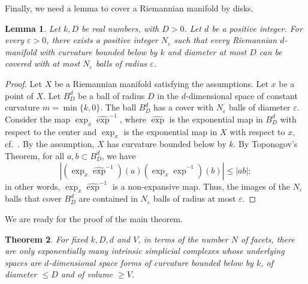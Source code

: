 \documentclass[a4paper,11pt]{article}
\theoremstyle{plain}
\newtheorem{theorem}{\bf Theorem}[section]
\newtheorem{lemma}[theorem]{Lemma}
\theoremstyle{definition}
\newcommand{\e}{\varepsilon}
\begin{document}
Finally, we need a lemma to cover a Riemannian manifold by disks.

\begin{lemma}\label{lem:finitecover}
Let $k, D$ be real numbers, with $D>0$. Let $d$ be a positive integer. For every $\e>0$, there exists a positive integer $N_\e$ such that every Riemannian $d$-manifold with curvature bounded below by $k$ and diameter at most $D$ can be covered with at most $N_\e$ balls of radius $\e$.
\end{lemma}

\begin{proof}
Let $X$ be a Riemannian manifold satisfying the assumptions. Let $x$ be a point of $X$. 
Let $B^d_D$ be a ball of radius $D$ in the $d$-dimensional space 
of constant curvature $m = \min \{ k,0 \}$. The ball $B^d_D$ has a cover with 
$N_\e$ balls of diameter $\e$.
Consider the map $ \exp_x \widehat{\exp}^{-1}$, where $\widehat{\exp}$ is 
the exponential map in $B^d_D$ with respect to the center and $\exp_x$ 
is the exponential map in $X$ with respect to $x$, cf.\ \cite[Ch.~1,~Sec.~2]{CheegerComp}.
By the assumption, $X$ has curvature bounded below by $k$. By Toponogov's Theorem, for all $a,b\subset B^d_D$, we have \[|(\exp_x \widehat{\exp}^{-1})(a) (\exp_x\widehat{\exp}^{-1})(b)|\leq |ab|;\] in other words, $\exp_x \widehat{\exp}^{-1}$ is a non-expansive map.
Thus, the images of the $N_\e$ balls that cover $B^d_D$ are contained 
in $N_\e$ balls of radius at most $\e$.
\end{proof}

We are ready for the proof of the main theorem.

\begin{theorem} \label{thm:DiscreteCheeger}
For fixed $k, D, d$ and $V$, in terms of the number $N$ of facets, there are only exponentially many intrinsic simplicial complexes whose underlying spaces are $d$-dimensional space forms of curvature bounded below by $k$, of diameter $\le D$ and of volume $\ge V$. 
\end{theorem}
\end{document}
